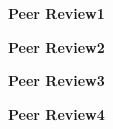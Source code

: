 \documentclass{article}
\begin{document}


  
  

\newpage
\textbf{Peer Review1}\label{review1}


\newpage
\textbf{Peer Review2}\label{review2}


\newpage
\textbf{Peer Review3}\label{review3}


\newpage
\textbf{Peer Review4}\label{review4}

\end{document}
